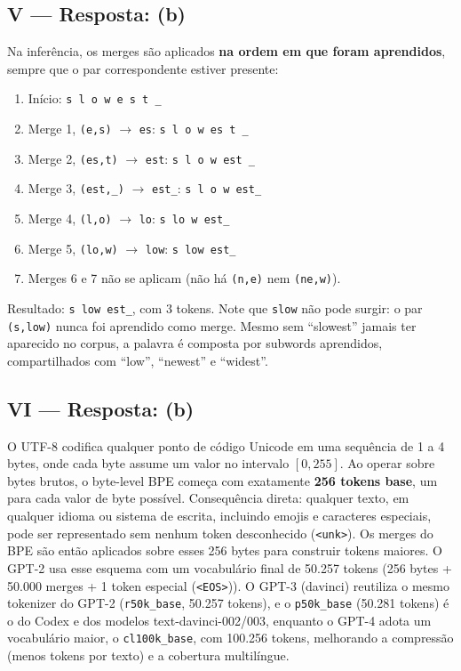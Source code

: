 \documentclass{dlproblemset}
\begin{document}
\subsection*{V — Resposta: (b)}
Na inferência, os merges são aplicados \textbf{na ordem em que foram aprendidos},
sempre que o par correspondente estiver presente:
\begin{enumerate}
  \item Início: \texttt{s l o w e s t \_}
  \item Merge 1, \texttt{(e,s)} $\rightarrow$ \texttt{es}: \quad \texttt{s l o w es t \_}
  \item Merge 2, \texttt{(es,t)} $\rightarrow$ \texttt{est}: \quad \texttt{s l o w est \_}
  \item Merge 3, \texttt{(est,\_)} $\rightarrow$ \texttt{est\_}: \quad \texttt{s l o w est\_}
  \item Merge 4, \texttt{(l,o)} $\rightarrow$ \texttt{lo}: \quad \texttt{s lo w est\_}
  \item Merge 5, \texttt{(lo,w)} $\rightarrow$ \texttt{low}: \quad \texttt{s low est\_}
  \item Merges 6 e 7 não se aplicam (não há \texttt{(n,e)} nem \texttt{(ne,w)}).
\end{enumerate}
Resultado: \texttt{s}~\texttt{low}~\texttt{est\_}, com 3 tokens. Note que
\texttt{slow} não pode surgir: o par \texttt{(s,low)} nunca foi aprendido como
merge. Mesmo sem ``slowest'' jamais ter aparecido no corpus, a palavra é composta
por subwords aprendidos, compartilhados com ``low'', ``newest'' e ``widest''.

\subsection*{VI — Resposta: (b)}
O UTF-8 codifica qualquer ponto de código Unicode em uma sequência de 1 a 4 bytes,
onde cada byte assume um valor no intervalo $[0, 255]$. Ao operar sobre bytes brutos,
o byte-level BPE começa com exatamente \textbf{256 tokens base}, um para cada valor
de byte possível. Consequência direta: qualquer texto, em qualquer idioma ou sistema
de escrita, incluindo emojis e caracteres especiais, pode ser representado sem
nenhum token desconhecido (\texttt{<unk>}). Os merges do BPE são então aplicados sobre
esses 256 bytes para construir tokens maiores. O GPT-2 usa esse esquema com um
vocabulário final de 50.257 tokens (256 bytes + 50.000 merges + 1 token especial (\texttt{<EOS>})).
O GPT-3 (davinci) reutiliza o mesmo tokenizer do GPT-2 (\texttt{r50k\_base}, 50.257 tokens), e o
\texttt{p50k\_base} (50.281 tokens) é o do Codex e dos modelos text-davinci-002/003, enquanto
o GPT-4 adota um vocabulário maior, o \texttt{cl100k\_base}, com 100.256 tokens, melhorando
a compressão (menos tokens por texto) e a cobertura multilíngue.
\end{document}
